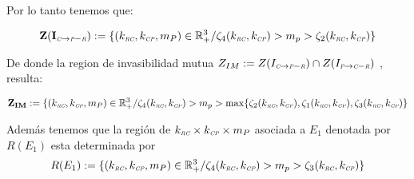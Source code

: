 Por lo tanto tenemos que:

\begin{equation}
\mathbf{Z(I_{\C \to \PP-\R})} := \{ (k_{\RC},k_{\CP},m_P) \in \mathbb{R}^3_+ / \zeta_4(k_{\RC},k_{\CP}) > m_p > \zeta_2(k_{\RC},k_{\CP}) \}
\end{equation}

De donde la region de invasibilidad mutua $Z_{IM} := Z(I_{\C \to \PP-\R}) \cap Z(I_{\PP \to \C-\R})$ , resulta:


\begin{equation}
\mathbf{Z_{IM}} := \{ (k_{\RC},k_{\CP},m_P) \in \mathbb{R}^3_+ / \zeta_4(k_{\RC},k_{\CP}) > m_p > \max \{ \zeta_2(k_{\RC},k_{\CP}) , \zeta_1(k_{\RC},k_{\CP}) , \zeta_3(k_{\RC},k_{\CP}) \}
\end{equation}

Adem\'as tenemos que la regi\'on de $k_{\RC} \times k_{\CP} \times m_P$ asociada a $E_1$ denotada por $R(E_1)$ esta determinada por
\begin{equation}
  R(E_1) := \{ (k_{\RC},k_{\CP},m_P) \in \mathbb{R}^3_+ / \zeta_4(k_{\RC},k_{\CP}) > m_p > \zeta_3(k_{\RC},k_{\CP}) \}
\end{equation}





